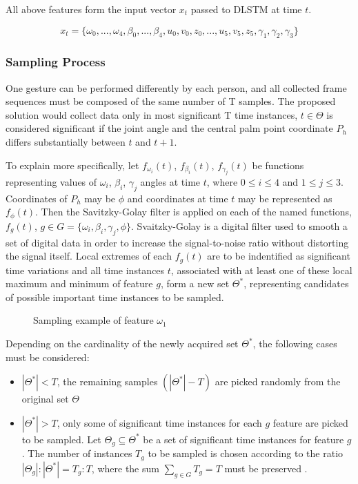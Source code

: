 All above features form the input vector $x_t$ passed to DLSTM at time $t$.

\begin{equation}
	{x_t = \{\omega_0, ...,\omega_4, \beta_0, ..., \beta_4, u_0,v_0,z_0, ..., u_5,v_5,z_5, \gamma_1, \gamma_2, \gamma_3\}}
\end{equation}

\subsubsection{Sampling Process}

One gesture can be performed differently by each person, and all collected frame sequences must be composed of the same number of T samples. The proposed solution would collect data only in most significant T time instances, $t \in \Theta$ is considered significant if the joint angle and the central palm point coordinate $P_h$ differs substantially between $t$ and $t+1$.

To explain more specifically, let $f_{\omega_i}(t)$, $f_{\beta_i}(t)$, $f_{\gamma_j}(t)$ be functions representing values of $\omega_i$, $\beta_i$, $\gamma_j$ angles at time $t$, where $0 \leq i \leq 4$ and $1 \leq j \leq 3$. Coordinates of $P_h$ may be $\phi$ and coordinates at time $t$ may be represented as $f_{\phi}(t)$. Then the Savitzky-Golay filter \cite{savitzkty} is applied on each of the named functions, $f_g(t)$, $g \in G = \{\omega_i,\beta_i, \gamma_j, \phi\}$. Svaitzky-Golay is a digital filter used to smooth a set of digital data in order to increase the signal-to-noise ratio without distorting the signal itself. Local extremes of each $f_g(t)$ are to be indentified as significant time variations and all time instances $t$, associated with at least one of these local maximum and minimum of feature $g$, form a new set $\Theta^*$, representing candidates of possible important time instances to be sampled. 

\begin{figure}[h]
	\centering
    \qquad
    \caption{Sampling example of feature $\omega_1$}
\end{figure}

Depending on the cardinality of the newly acquired set $\Theta^*$, the following cases must be considered:

\begin{itemize}
	\item $|\Theta^*| < T$, the remaining samples $(|\Theta^*|-T)$ are picked randomly from the original set $\Theta$
	\item $|\Theta^*| > T$, only some of significant time instances for each $g$ feature are picked to be sampled. Let $\Theta_g \subseteq \Theta^*$ be a set of significant time instances for feature $g$. The number of instances $T_g$ to be sampled is chosen according to the ratio $|\Theta_g|:|\Theta^*| = T_g:T$, where the sum $\sum_{g \in G}{T_g} = T$ must be preserved \cite{avola}.
\end{itemize}

